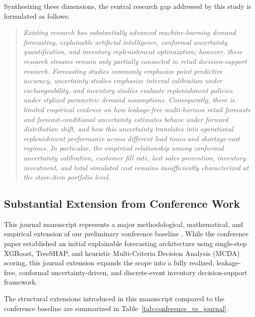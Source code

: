 Synthesizing these dimensions, the central research gap addressed by this study is formulated as follows:

\begin{quote}
\textit{Existing research has substantially advanced machine-learning demand forecasting, explainable artificial intelligence, conformal uncertainty quantification, and inventory replenishment optimization; however, these research streams remain only partially connected in retail decision-support research. Forecasting studies commonly emphasize point predictive accuracy, uncertainty studies emphasize interval calibration under exchangeability, and inventory studies evaluate replenishment policies under stylized parametric demand assumptions. Consequently, there is limited empirical evidence on how leakage-free multi-horizon retail forecasts and forecast-conditional uncertainty estimates behave under forward distribution shift, and how this uncertainty translates into operational replenishment performance across different lead times and shortage-cost regimes. In particular, the empirical relationship among conformal uncertainty calibration, customer fill rate, lost sales prevention, inventory investment, and total simulated cost remains insufficiently characterized at the store-item portfolio level.}
\end{quote}

\subsection{Substantial Extension from Conference Work}
This journal manuscript represents a major methodological, mathematical, and empirical extension of our preliminary conference baseline \cite{e_idss_ieee}. While the conference paper established an initial explainable forecasting architecture using single-step XGBoost, TreeSHAP, and heuristic Multi-Criteria Decision Analysis (MCDA) scoring, this journal extension expands the scope into a fully realized, leakage-free, conformal uncertainty-driven, and discrete-event inventory decision-support framework.

The structural extensions introduced in this manuscript compared to the conference baseline are summarized in Table~\ref{tab:conference_vs_journal}.

